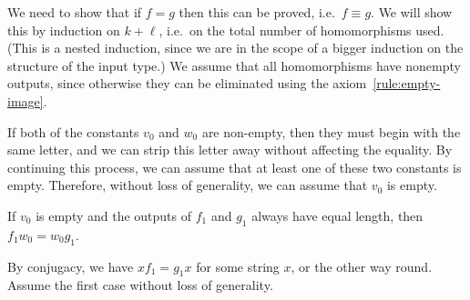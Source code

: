 We need to show that if $f=g$ then this can be proved, i.e.~$f \equiv g$. We will show this by induction on $k + \ell$, i.e.~on the total number of homomorphisms used. (This is a nested induction, since we are in the scope of a bigger induction on the structure of the input type.)  We assume that all homomorphisms have nonempty outputs, since otherwise they can be eliminated using the axiom~\eqref{rule:empty-image}.


If both of the constants $v_0$ and $w_0$ are non-empty, then they must begin with the same letter, and we can strip this letter away without affecting the equality. By continuing this process, we can assume that at least one of these two constants is empty. Therefore, without loss of generality, we can assume that $v_0$ is empty.


\begin{lemma}
    If $v_0$ is empty and the outputs of $f_1$ and $g_1$ always have equal length, then  $f_1 w_0 = w_0 g_1$.
\end{lemma}




By conjugacy, we have $x f_1 = g_1 x$ for some string $x$, or the other way round. Assume the first case without loss of generality. 


